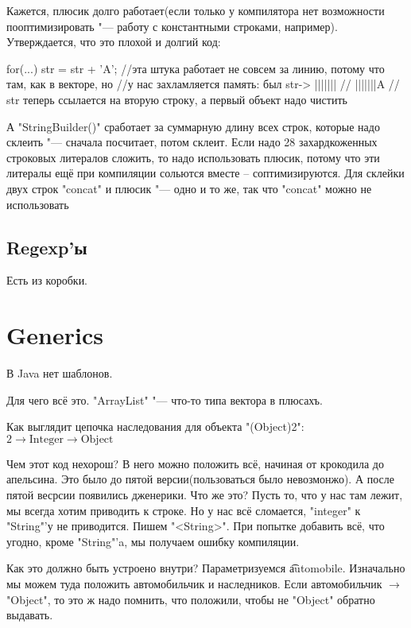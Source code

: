 Кажется, плюсик долго работает(если только у компилятора нет возможности пооптимизировать "--- работу с константными строками, например).
Утверждается, что это плохой и долгий код:
\begin{javacode}
for(...)
	str = str + 'A';
//эта штука работает не совсем за линию, потому что там, как в векторе, но
//у нас захламляется память: был str-> |||||||
//                                     |||||||A
//                           str теперь ссылается на вторую строку, а первый объект надо чистить 
\end{javacode}

А \java"StringBuilder()" сработает за суммарную длину всех строк, которые надо склеить "--- сначала посчитает, потом склеит.
Если надо 28 захардкоженных строковых литералов сложить, то надо использовать плюсик, потому что эти литералы ещё
при компиляции сольются вместе -- соптимизируются.
Для склейки двух строк \java"concat" и плюсик "--- одно и то же, так что \java"concat" можно не использовать

\section{Regexp'ы}
Есть из коробки.


\chapter{Generics}
В Java нет шаблонов.

Для чего всё это.
\java"ArrayList" "--- что-то типа вектора в плюсахъ.

Как выглядит цепочка наследования для объекта \java"(Object)2":
$2 \rightarrow \text{Integer} \rightarrow \text{Object}$

Чем этот код нехорош? В него можно положить всё, начиная от крокодила до апельсина. Это было до пятой версии(пользоваться было невозмонжо).
А после пятой весрсии появились дженерики.
Что же это?
Пусть то, что у нас там лежит, мы всегда хотим приводить к строке. Но у нас всё сломается, \java"integer" к \java"String"'у не приводится.
Пишем \java"<String>".
При попытке добавить всё, что угодно, кроме \java"String"'a, мы получаем ошибку компиляции.


Как это должно быть устроено внутри?
Параметризуемся \t{automobile}.
Изначально мы можем туда положить автомобильчик и наследников.
Если автомобильчик $\rightarrow$ \java"Object", то это ж надо помнить, что положили, чтобы не \java"Object" обратно выдавать.

